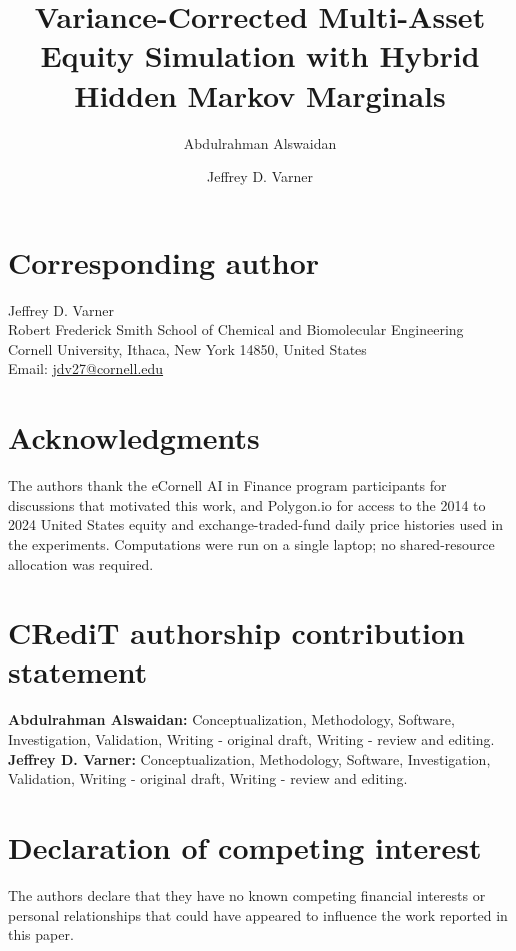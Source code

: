 \documentclass[preprint,authoryear]{elsarticle}
\begin{document}
\begin{frontmatter}

\title{Variance-Corrected Multi-Asset Equity Simulation with Hybrid Hidden Markov Marginals}

\author[smith]{Abdulrahman Alswaidan}

\author[smith]{Jeffrey D. Varner}


\end{frontmatter}

\section*{Corresponding author}
Jeffrey D. Varner\\
Robert Frederick Smith School of Chemical and Biomolecular Engineering\\
Cornell University, Ithaca, New York 14850, United States\\
Email: \href{mailto:jdv27@cornell.edu}{jdv27@cornell.edu}

\section*{Acknowledgments}
The authors thank the eCornell AI in Finance program participants for
discussions that motivated this work,
and Polygon.io for access to the 2014 to 2024 United States equity and
exchange-traded-fund daily price histories used in the experiments.
Computations were run on a single laptop; no shared-resource allocation
was required.

\section*{CRediT authorship contribution statement}
\textbf{Abdulrahman Alswaidan:} Conceptualization, Methodology,
Software, Investigation, Validation, Writing - original draft, Writing
- review and editing. \textbf{Jeffrey D. Varner:} Conceptualization,
Methodology, Software, Investigation, Validation, Writing - original
draft, Writing - review and editing.

\section*{Declaration of competing interest}
The authors declare that they have no known competing financial
interests or personal relationships that could have appeared to
influence the work reported in this paper.
\end{document}
